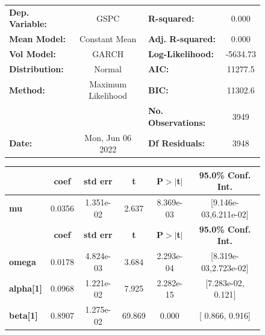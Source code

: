 \documentclass[a4paper, oneside]{discothesis}
\begin{document}
\begin{figure}

\begin{multicols}{2}
{\fontsize{2.5}{4}\selectfont

\begin{center}
\begin{tabular}{lclc}
\toprule
\textbf{Dep. Variable:} &        GSPC        & \textbf{  R-squared:         } &     0.000   \\
\textbf{Mean Model:}    &   Constant Mean    & \textbf{  Adj. R-squared:    } &     0.000   \\
\textbf{Vol Model:}     &       GARCH        & \textbf{  Log-Likelihood:    } &   -5634.73  \\
\textbf{Distribution:}  &       Normal       & \textbf{  AIC:               } &    11277.5  \\
\textbf{Method:}        & Maximum Likelihood & \textbf{  BIC:               } &    11302.6  \\
\textbf{}               &                    & \textbf{  No. Observations:  } &    3949     \\
\textbf{Date:}          &  Mon, Jun 06 2022  & \textbf{  Df Residuals:      } &    3948     \\
\bottomrule
\end{tabular}
\begin{tabular}{lccccc}
            & \textbf{coef} & \textbf{std err} & \textbf{t} & \textbf{P$> |$t$|$} & \textbf{95.0\% Conf. Int.}  \\
\midrule
\textbf{mu} &       0.0356  &    1.351e-02     &     2.637  &      8.369e-03       &   [9.146e-03,6.211e-02]     \\
                  & \textbf{coef} & \textbf{std err} & \textbf{t} & \textbf{P$> |$t$|$} & \textbf{95.0\% Conf. Int.}  \\
\midrule
\textbf{omega}    &       0.0178  &    4.824e-03     &     3.684  &      2.293e-04       &   [8.319e-03,2.723e-02]     \\
\textbf{alpha[1]} &       0.0968  &    1.221e-02     &     7.925  &      2.282e-15       &    [7.283e-02,  0.121]      \\
\textbf{beta[1]}  &       0.8907  &    1.275e-02     &    69.869  &        0.000         &     [  0.866,  0.916]       \\
\bottomrule
\end{tabular}
\end{center}

}
\end{multicols}
\end{figure}
\end{document}
